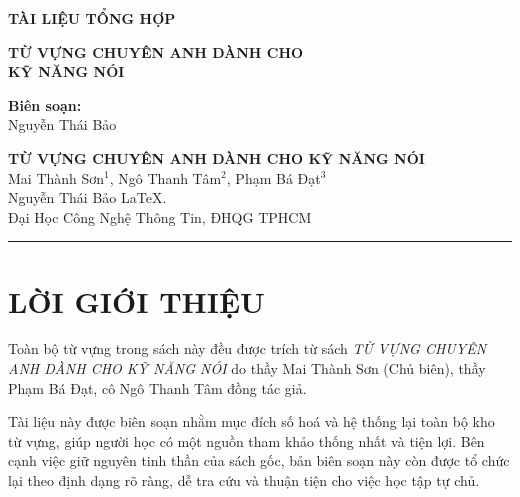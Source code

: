\begin{titlepage}
   
\begin{center}
\textbf{\LARGE TÀI LIỆU TỔNG HỢP}\\[0.5cm] \vspace{20pt}

\vfill

\textbf{\LARGE  TỪ VỰNG CHUYÊN ANH DÀNH CHO\\ KỸ NĂNG NÓI}\\

\vfill

\textbf {\large Biên soạn:}\\[0.2cm]
\Large {Nguyễn Thái Bảo}\\[0.1cm]
\end{center}

\end{titlepage}

\begin{center}
    
    \large \textbf{TỪ VỰNG CHUYÊN ANH DÀNH CHO KỸ NĂNG NÓI}\\
    \vspace{2mm}
    Mai Thành Sơn$^{1}$, Ngô Thanh Tâm$^{2}$, Phạm Bá Đạt$^{3}$\\
    \vspace{7.5mm}
    Nguyễn Thái Bảo \LaTeX.\\ Đại Học Công Nghệ Thông Tin, ĐHQG TPHCM  

        \begin{center}
		    \textcolor{azul}{\rule{170mm}{0.5mm}}
	    \end{center}	
\end{center}

\section*{LỜI GIỚI THIỆU}
\thispagestyle{empty}
\noindent
Toàn bộ từ vựng trong sách này đều được trích từ sách \emph{TỪ VỰNG CHUYÊN ANH DÀNH CHO KỸ NĂNG NÓI} do thầy Mai Thành Sơn (Chủ biên), thầy Phạm Bá Đạt, cô Ngô Thanh Tâm đồng tác giả.

\vspace{3mm}
\noindent
Tài liệu này được biên soạn nhằm mục đích số hoá và hệ thống lại toàn bộ kho từ vựng,
giúp người học có một nguồn tham khảo thống nhất và tiện lợi. 
Bên cạnh việc giữ nguyên tinh thần của sách gốc, bản biên soạn này còn được 
tổ chức lại theo định dạng rõ ràng, dễ tra cứu và thuận tiện cho việc học tập tự chủ.


